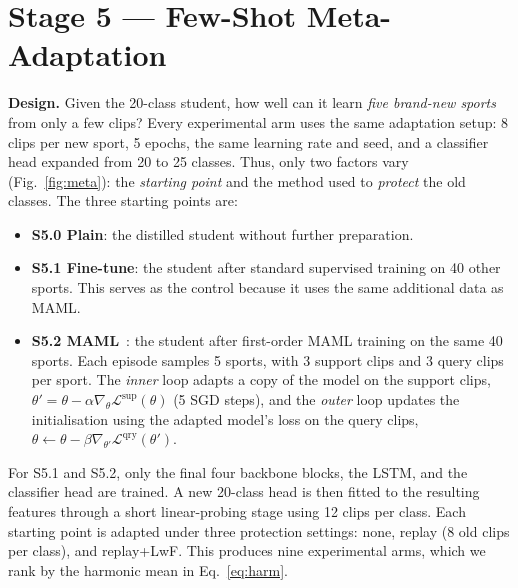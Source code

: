 \documentclass[conference]{IEEEtran}
\begin{document}
\section{Stage 5 --- Few-Shot Meta-Adaptation}
\label{sec:meta}
\textbf{Design.} Given the 20-class student, how well can it learn \emph{five brand-new
sports} from only a few clips? Every experimental arm uses the same adaptation setup:
8 clips per new sport, 5 epochs, the same learning rate and seed, and a classifier head
expanded from 20 to 25 classes. Thus, only two factors vary (Fig.~\ref{fig:meta}): the
\emph{starting point} and the method used to \emph{protect} the old classes. The three
starting points are:
\begin{itemize}
\item \textbf{S5.0 Plain}: the distilled student without further preparation.
\item \textbf{S5.1 Fine-tune}: the student after standard supervised training on 40 other
sports. This serves as the control because it uses the same additional data as MAML.
\item \textbf{S5.2 MAML}~\cite{finn2017maml}: the student after first-order MAML training
on the same 40 sports. Each episode samples 5 sports, with 3 support clips and 3 query
clips per sport. The \emph{inner} loop adapts a copy of the model on the support clips,
$\theta'=\theta-\alpha\nabla_\theta\mathcal{L}^{\text{sup}}(\theta)$ (5 SGD steps), and the
\emph{outer} loop updates the initialisation using the adapted model's loss on the query clips,
$\theta\leftarrow\theta-\beta\nabla_{\theta'}\mathcal{L}^{\text{qry}}(\theta')$.
\end{itemize}
For S5.1 and S5.2, only the final four backbone blocks, the LSTM, and the classifier head
are trained. A new 20-class head is then fitted to the resulting features through a short
linear-probing stage using 12 clips per class. Each starting point is adapted under three
protection settings: none, replay (8 old clips per class), and replay+LwF. This produces
nine experimental arms, which we rank by the harmonic mean in Eq.~\eqref{eq:harm}.
\end{document}
